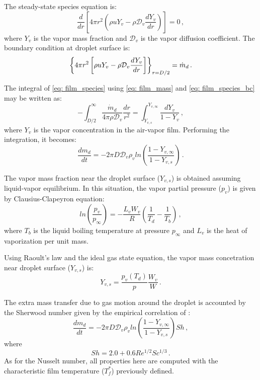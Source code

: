 The steady-state species equation is:
\begin{equation}\label{eq: film_species}
\frac{d}{d r} \left[ 4\pi r^2 \left( \rho u Y_v -\rho \mathcal{D}_v  \frac{d Y_v}{d r}  \right)\right] = 0\, ,
\end{equation}
where $Y_v$ is the vapor mass fraction and $\mathcal{D}_v$ is the vapor diffusion coefficient. The boundary condition at droplet surface is:
\begin{equation}\label{eq: film_species_bc}
 \left\lbrace 4\pi r^2 \left[ \rho u Y_v -\rho \mathcal{D}_v  \frac{d Y_v}{d r} \right]\right\rbrace  _{r=D/2}  = \dot{m}_d\, . \\
\end{equation}

The integral of \eqref{eq: film_species} using \eqref{eq: film_mass} and \eqref{eq: film_species_bc} may be written as:
\begin{equation}
-\int_{D/2}^{\infty} \frac{\dot{m}_d}{4\pi \rho \mathcal{D}_v}\frac{dr}{r^2} = \int_{Y_{v,s}}^{Y_{v,\infty}} \frac{dY_v}{1-Y_v} \, ,
\end{equation}
where $Y_{v}$ is the vapor concentration in the air-vapor film. Performing the integration, it becomes:
\begin{equation}
 \frac{dm_d}{dt} = -2\pi D \mathcal{D}_v \rho_v ln \left(
\frac{1-Y_{v,\infty}}{1-Y_{v,s}} \right) \, .
\end{equation}


The vapor mass fraction near the droplet surface ($Y_{v,s}$) is obtained assuming liquid-vapor equilibrium. In this situation, the vapor partial pressure ($p_v$) is given by Clausius-Clapeyron equation:
\begin{equation}
ln \left(\frac{p_v}{p_\infty}\right) = -\frac{L_v W_{v}}{R} \left(\frac{1}{T_d}-\frac{1}{T_b}\right) \, ,
\end{equation}
where $T_b$ is the liquid boiling temperature at pressure $p_{\infty}$ and $L_v$ is the heat of vaporization per unit mass.

Using Raoult's law and the ideal gas state equation, the vapor mass concetration near droplet surface ($Y_{v,s}$) is:
\begin{equation}
Y_{v,s} = \frac{p_v \left(T_d\right)}{p}\frac{W_v}{W} \, .
\end{equation}


The extra mass transfer due to gas motion around the droplet is accounted by the Sherwood number given by the empirical correlation of \cite{ranzmarshall}:
\begin{equation}\label{eq: dropxxxmass}
 \frac{dm_d}{dt} = -2\pi D \mathcal{D}_v \rho_v ln \left(
\frac{1-Y_{v,\infty}}{1-Y_{v,s}} \right) Sh \, ,
\end{equation}
where
\begin{equation}
 Sh = 2.0 +0.6 Re^{1/2} Sc^{1/3} \, .
\end{equation}
As for the Nusselt number, all properties here are computed with the characteristic film temperature ($T^{*}_f$) previously defined.

